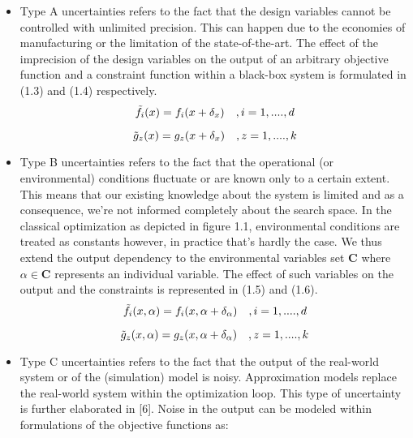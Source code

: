  \begin{itemize}
	\item Type A uncertainties refers to the fact that the design variables cannot be controlled with unlimited precision. This can happen due to the economies of manufacturing or the limitation of the state-of-the-art. The effect of the imprecision of the design variables on the output of an arbitrary objective function and a constraint function within a black-box system is formulated in (1.3) and (1.4) respectively.
	\begin{equation}
    \Tilde{f}_i(x) = {f}_i(x+ \delta_{x}) \quad, i=1,....,d
    \end{equation} 
    
    \begin{equation}
    \Tilde{g}_z(x) = {g}_z(x+ \delta_{x}) \quad, z=1,....,k
    \end{equation} 
	
	\item Type B uncertainties refers to the fact that the operational (or environmental) conditions fluctuate or are known only to a certain extent. This means that our existing knowledge about the system is limited and as a consequence, we're not informed completely about the search space. In the classical optimization as depicted in figure 1.1, environmental conditions are treated as constants however, in practice that's hardly the case. We thus extend the output dependency to the environmental variables set $ \textbf{C}$ where $ \alpha \in \textbf{C} $ represents an individual variable. The effect of such variables on the output and the constraints is represented in (1.5) and (1.6).
	\begin{equation}
    \Tilde{f}_i(x,\alpha) = {f}_i(x,\alpha+ \delta_{\alpha}) \quad,  i=1,....,d
    \end{equation} 
    
    \begin{equation}
    \Tilde{g}_z(x,\alpha) = {g}_z(x,\alpha+ \delta_{\alpha}) \quad , z=1,....,k
    \end{equation} 
	
	\item Type C uncertainties refers to the fact that the output of the real-world system or of the (simulation) model is noisy. Approximation models replace the real-world system within the optimization loop. This type of uncertainty is further elaborated in [6]. Noise in the output can be modeled within formulations of the objective functions as:
	

\end{itemize}
